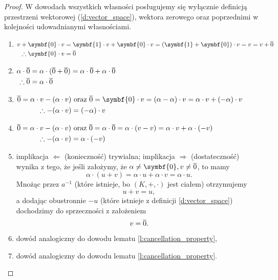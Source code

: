 \begin{proof}
    W dowodach wszystkich własności posługujemy się wyłącznie definicją przestrzeni wektorowej (\ref{d:vector_space}), wektora zerowego oraz poprzednimi w kolejności udowadnianymi własnościami.
    \begin{enumerate}
        \item $\begin{aligned}[t]
            v + \symbf{0} \cdot v &= \symbf{1} \cdot v + \symbf{0} \cdot v = (\symbf{1} + \symbf{0}) \cdot v = v = v + \ol{0} \\
            \therefore \symbf{0} \cdot v &= \ol{0}
            \end{aligned}$
        \item $\begin{aligned}[t]
            \alpha \cdot \overline{0} &= \alpha \cdot (\overline{0} + \overline{0}) = \alpha \cdot \overline{0} + \alpha \cdot \overline{0} \\
            \therefore \overline{0} &= \alpha \cdot \overline{0}
            \end{aligned}$
        \item $\begin{aligned}[t]
            \ol{0} = \alpha \cdot v - (\alpha \cdot v) &\text{ oraz } \ol{0} = \symbf{0} \cdot v = (\alpha - \alpha) \cdot v = \alpha \cdot v + (-\alpha) \cdot v \\
            \therefore -(\alpha \cdot v) &= (-\alpha) \cdot v
            \end{aligned}$
        \item $\begin{aligned}[t]
            \overline{0} = \alpha \cdot v - (\alpha \cdot v) &\text{ oraz } \overline{0} = \alpha \cdot \overline{0} = \alpha \cdot (v - v) = \alpha \cdot v + \alpha \cdot (-v) \\
            \therefore -(\alpha \cdot v) &= \alpha \cdot (-v)
            \end{aligned}$
        \item implikacja $\Leftarrow$ (konieczność) trywialna; implikacja $\Rightarrow$ (dostateczność) wynika z tego, że jeśli założymy, że $\alpha \neq \symbf{0}, v \neq \ol{0}$, to mamy
            \[ \alpha \cdot (u + v) = \alpha \cdot u + \alpha \cdot v = \alpha \cdot u. \]
            Mnożąc przez $a^{-1}$ (które istnieje, bo $(K, +, \cdot)$ jest ciałem) otrzymujemy
            \[ u + v = u, \]
            a dodając obustronnie $-u$ (które istnieje z definicji \ref{d:vector_space}) dochodzimy do sprzeczności z założeniem
            \[ v = \overline{0}. \]
        \item dowód analogiczny do dowodu lematu \ref{l:cancellation_property},
        \item dowód analogiczny do dowodu lematu \ref{l:cancellation_property}.
    \end{enumerate}
\end{proof}

